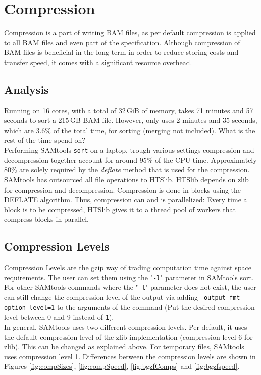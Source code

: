 \section{Compression} 
Compression is a part of writing BAM files, as per default compression is applied to all BAM files and even part of the specification. Although compression of BAM files is beneficial in the long term in order to reduce storing costs and transfer speed, it comes with a significant resource overhead. 

\subsection{Analysis}
Running on 16 cores, with a total of 32\,GiB of memory, \sort takes 71 minutes and 57 seconds to sort a 215\,GB BAM file. However, \sort only uses 2 minutes and 35 seconds, which are 3.6\% of the total time, for sorting (merging not included). What is the rest of the time spend on? \\ 
Performing SAMtools \texttt{sort} on a laptop, trough various settings compression and decompression together account for around 95\% of the CPU time. Approximately 80\% are solely required by the \textit{deflate} method that is used for the compression. \\
SAMtools has outsourced all file operations to HTSlib. HTSlib depends on zlib for compression and decompression. Compression is done in blocks using the DEFLATE algorithm. Thus, compression can and is parallelized: Every time a block is to be compressed, HTSlib gives it to a thread pool of workers that compress blocks in parallel.


\subsection{Compression Levels}
Compression Levels are  the gzip way of trading computation time against space requirements. The user can set them using the "\texttt{-l}" parameter in SAMtools sort. For other SAMtools commands where the "\texttt{-l}" parameter does not exist, the user can still change the compression level of the output via adding \texttt{--output-fmt-option level=1} to the arguments of the command (Put the desired compression level between 0 and 9 instead of \texttt{1}). \\
In general, SAMtools uses two different compression levels. Per default, it uses the default compression level of the zlib implementation (compression level 6 for zlib). This can be changed as explained above. For temporary files, SAMtools uses compression level 1.
Differences between the compression levels are shown in Figures \ref{fig:compSizes}, \ref{fig:compSpeed}, \ref{fig:bgzfComps} and \ref{fig:bgzfspeed}.

